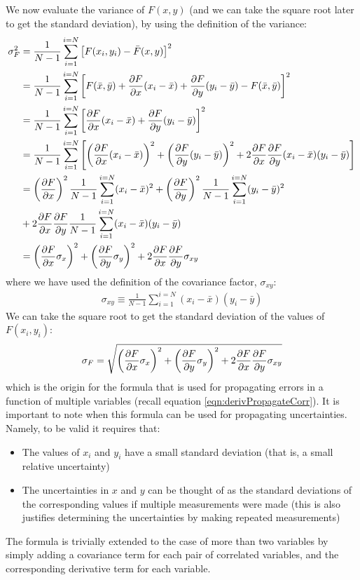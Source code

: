 We now evaluate the variance of $F(x,y)$ (and we can take the square root later to get the standard deviation), by using the definition of the variance:
\begin{align}
\sigma_F^2&=\frac{1}{N-1}\sum_{i=1}^{i=N}\left[F(x_i,y_i)-\bar F(x,y)\right]^2\nonumber\\
&=\frac{1}{N-1}\sum_{i=1}^{i=N}\left[F(\bar x,\bar y)+\frac{\partial F}{\partial x}(x_i-\bar x)+\frac{\partial F}{\partial y}(y_i-\bar y)-F(\bar x,\bar y)\right]^2\nonumber\\
&=\frac{1}{N-1}\sum_{i=1}^{i=N}\left[\frac{\partial F}{\partial x}(x_i-\bar x)+\frac{\partial F}{\partial y}(y_i-\bar y)\right]^2\nonumber\\
&=\frac{1}{N-1}\sum_{i=1}^{i=N}\left[\left(\frac{\partial F}{\partial x}(x_i-\bar x)\right)^2+\left(\frac{\partial F}{\partial y}(y_i-\bar y)\right)^2+2 \frac{\partial F}{\partial x}\frac{\partial F}{\partial y}(x_i-\bar x) (y_i-\bar y) \right]\nonumber\\
&=\left(\frac{\partial F}{\partial x}\right)^2\frac{1}{N-1}\sum_{i=1}^{i=N}(x_i-\bar x)^2+\left(\frac{\partial F}{\partial y}\right)^2\frac{1}{N-1}\sum_{i=1}^{i=N}(y_i-\bar y)^2\nonumber\\
&+2\frac{\partial F}{\partial x}\frac{\partial F}{\partial y}\frac{1}{N-1}\sum_{i=1}^{i=N}(x_i-\bar x) (y_i-\bar y)\nonumber\\
&=\left(\frac{\partial F}{\partial x}\sigma_x\right)^2+\left(\frac{\partial F}{\partial y}\sigma_y\right)^2+2\frac{\partial F}{\partial x}\frac{\partial F}{\partial y}\sigma_{xy}
\end{align}
where we have used the definition of the covariance factor, $\sigma_{xy}$:
\begin{align}
\sigma_{xy}\equiv\frac{1}{N-1}\sum_{i=1}^{i=N}(x_i-\bar x) (y_i-\bar y)
\end{align}
We can take the square root to get the standard deviation of the values of $F(x_i,y_i)$:
\begin{align}
\label{eqn:coverror}
\sigma_F=\sqrt{\left(\frac{\partial F}{\partial x}\sigma_x\right)^2+\left(\frac{\partial F}{\partial y}\sigma_y\right)^2+2\frac{\partial F}{\partial x}\frac{\partial F}{\partial y}\sigma_{xy}}
\end{align} 
which is the origin for the formula that is used for propagating errors in a function of multiple variables (recall equation \ref{eqn:derivPropagateCorr}). It is important to note when this formula can be used for propagating uncertainties. Namely, to be valid it requires that:
\begin{itemize}
\item The values of $x_i$ and $y_i$ have a small standard deviation (that is, a small relative uncertainty)
\item The uncertainties in $x$ and $y$ can be thought of as the standard deviations of the corresponding values if multiple measurements were made (this is also justifies determining the uncertainties by making repeated measurements)
\end{itemize}
The formula is trivially extended to the case of more than two variables by simply adding a covariance term for each pair of correlated variables, and the corresponding derivative term for each variable. 

